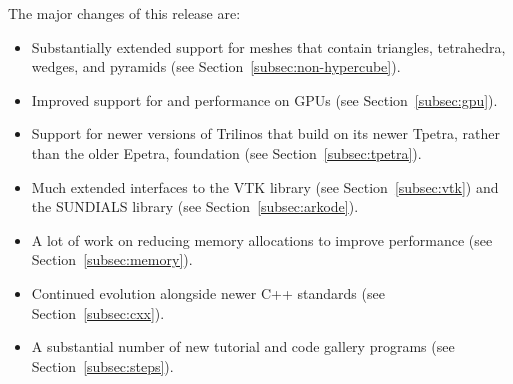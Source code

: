 \documentclass{ansarticle-preprint}
\begin{document}
The major changes of this release are:
%
\begin{itemize}
\item Substantially extended support for meshes that contain
  triangles, tetrahedra, wedges, and pyramids (see
  Section~\ref{subsec:non-hypercube}).
\item Improved support for and performance on GPUs (see
  Section~\ref{subsec:gpu}).
\item Support for newer versions of Trilinos that build on its newer
  Tpetra, rather than the older Epetra, foundation (see
  Section~\ref{subsec:tpetra}).
\item Much extended interfaces to the VTK library (see
  Section~\ref{subsec:vtk}) and the SUNDIALS library (see
  Section~\ref{subsec:arkode}).
\item A lot of work on reducing memory allocations to improve
  performance (see Section~\ref{subsec:memory}).
\item Continued evolution alongside newer C++ standards (see
  Section~\ref{subsec:cxx}).
\item A substantial number of new tutorial and code gallery programs
  (see Section~\ref{subsec:steps}).
\end{itemize}
%
\end{document}
